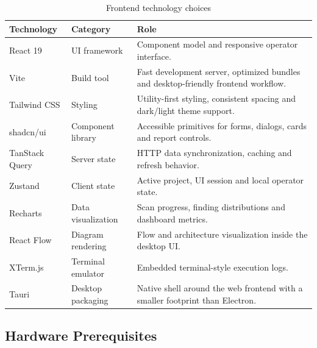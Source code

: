 \documentclass[12pt,a4paper]{report}
\begin{document}
\begin{table}[H]
    \centering
    \renewcommand{\arraystretch}{1.35}
    \begin{tabular}{|p{}|p{}|p{}|}
        \hline
        \textbf{Technology} & \textbf{Category} & \textbf{Role} \\
        \hline
        React 19 & UI framework & Component model and responsive operator
        interface. \\
        \hline
        Vite & Build tool & Fast development server, optimized bundles and
        desktop-friendly frontend workflow. \\
        \hline
        Tailwind CSS & Styling & Utility-first styling, consistent spacing and
        dark/light theme support. \\
        \hline
        shadcn/ui & Component library & Accessible primitives for forms, dialogs,
        cards and report controls. \\
        \hline
        TanStack Query & Server state & HTTP data synchronization, caching and
        refresh behavior. \\
        \hline
        Zustand & Client state & Active project, UI session and local operator
        state. \\
        \hline
        Recharts & Data visualization & Scan progress, finding distributions and
        dashboard metrics. \\
        \hline
        React Flow & Diagram rendering & Flow and architecture visualization inside
        the desktop UI. \\
        \hline
        XTerm.js & Terminal emulator & Embedded terminal-style execution logs. \\
        \hline
        Tauri & Desktop packaging & Native shell around the web frontend with a
        smaller footprint than Electron. \\
        \hline
    \end{tabular}
    \caption{Frontend technology choices}
    \label{tab:frontend_stack}
\end{table}

\subsection{Hardware Prerequisites}
\end{document}
